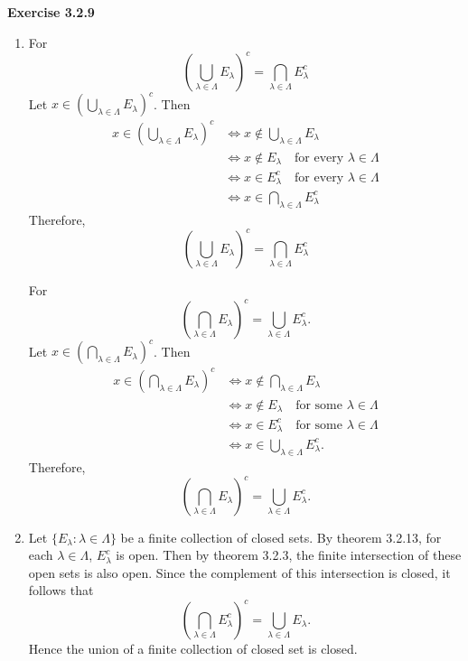 \documentclass[12pt]{article}
\begin{document}
\textbf{Exercise 3.2.9}
\begin{enumerate}[label=(\alph*)]
    \item For
          \[
              \left( \bigcup_{\lambda \in \Lambda } E_{\lambda } \right)^c = \bigcap_{\lambda \in \Lambda} E_{\lambda }^c
          \]
          Let \( x \in \left( \bigcup_{\lambda \in \Lambda } E_{\lambda } \right)^c \). Then
          \[
              \begin{split}
                  x \in \left( \bigcup_{\lambda \in \Lambda } E_{\lambda } \right)^c
                   & \iff x \not \in \bigcup_{\lambda \in \Lambda } E_{\lambda}              \\
                   & \iff x \not \in E_{\lambda} \quad \text{for every } \lambda \in \Lambda \\
                   & \iff x \in E_{\lambda}^c \quad \text{for every } \lambda \in \Lambda    \\
                   & \iff x \in \bigcap_{\lambda \in \Lambda } E_{\lambda}^c
              \end{split}
          \]
          Therefore,
          \[
              \left( \bigcup_{\lambda \in \Lambda } E_{\lambda } \right)^c = \bigcap_{\lambda \in \Lambda} E_{\lambda }^c
          \]

          For
          \[
              \left(\bigcap_{\lambda\in\Lambda}E_\lambda\right)^c
              = \bigcup_{\lambda\in\Lambda}E_\lambda^c.
          \]
          Let \( x \in \left(\bigcap_{\lambda\in\Lambda}E_\lambda\right)^c \).
          Then
          \[
              \begin{split}
                  x \in \left(\bigcap_{\lambda\in\Lambda}E_\lambda\right)^c
                   & \iff x \not \in \bigcap_{\lambda\in\Lambda}E_\lambda                   \\
                   & \iff x \not \in E_{\lambda} \quad \text{for some } \lambda \in \Lambda \\
                   & \iff x \in E_{\lambda}^c \quad \text{for some } \lambda \in \Lambda    \\
                   & \iff x \in \bigcup_{\lambda\in\Lambda}E_\lambda^c.
              \end{split}
          \]
          Therefore,
          \[
              \left(\bigcap_{\lambda\in\Lambda}E_\lambda\right)^c
              = \bigcup_{\lambda\in\Lambda}E_\lambda^c.
          \]


    \item Let \( \{E_{\lambda} : \lambda \in \Lambda\} \) be a finite collection of closed sets.
          By theorem 3.2.13, for each \( \lambda \in \Lambda \), \( E_\lambda^c \) is open.
          Then by theorem 3.2.3, the finite intersection of these open sets is also open.
          Since the complement of this intersection is closed, it follows that
          \[
              \left(\bigcap_{\lambda\in\Lambda}E_\lambda^c\right)^c = \bigcup_{\lambda\in\Lambda}E_\lambda.
          \]
          Hence the union of a finite collection of closed set is closed.



\end{enumerate}
\end{document}
